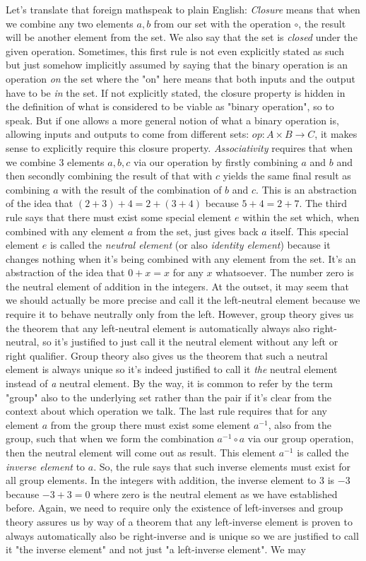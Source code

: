 Let's translate that foreign mathspeak to plain English: \emph{Closure} means that when we combine any two elements $a,b$ from our set with the operation $\circ$, the result will be another element from the set. We also say that the set is \emph{closed} under the given operation. Sometimes, this first rule is not even explicitly stated as such but just somehow implicitly assumed by saying that the binary operation is an operation \emph{on} the set where the "on" here means that both inputs and the output have to be \emph{in} the set. If not explicitly stated, the closure property is hidden in the definition of what is considered to be viable as "binary operation", so to speak. But if one allows a more general notion of what a binary operation is, allowing inputs and outputs to come from different sets: $op: A \times B \rightarrow C$, it makes sense to explicitly require this closure property. \emph{Associativity} requires that when we combine 3 elements $a,b,c$ via our operation by firstly combining $a$ and $b$ and then secondly combining the result of that with $c$ yields the same final result as combining $a$ with the result of the combination of $b$ and $c$. This is an abstraction of the idea that $(2+3)+4 = 2+(3+4)$ because $5+4 = 2+7$. The third rule says that there must exist some special element $e$ within the set which, when combined with any element $a$ from the set, just gives back $a$ itself. This special element $e$ is called the \emph{neutral element} (or also \emph{identity element}) because it changes nothing when it's being combined with any element from the set. It's an abstraction of the idea that $0+x = x$ for any $x$ whatsoever. The number zero is the neutral element of addition in the integers. At the outset, it may seem that we should actually be more precise and call it the left-neutral element because we require it to behave neutrally only from the left. However, group theory gives us the theorem that any left-neutral element is automatically always also right-neutral, so it's justified to just call it the neutral element without any left or right qualifier. Group theory also gives us the theorem that such a neutral element is always unique so it's indeed justified to call it \emph{the} neutral element instead of \emph{a} neutral element. By the way, it is common to refer by the term "group" also to the underlying set rather than the pair if it's clear from the context about which operation we talk. The last rule requires that for any element $a$ from the group there must exist some element $a^{-1}$, also from the group, such that when we form the combination $ a^{-1} \circ a$ via our group operation, then the neutral element will come out as result. This element $a^{-1}$ is called the \emph{inverse element} to $a$. So, the rule says that such inverse elements must exist for all group elements. In the integers with addition, the inverse element to $3$ is $-3$ because $-3 + 3 = 0$ where zero is the neutral element as we have established before. Again, we need to require only the existence of left-inverses and group theory assures us by way of a theorem that any left-inverse element is proven to always automatically also be right-inverse and is unique so we are justified to call it "the inverse element" and not just "a left-inverse element". We may 